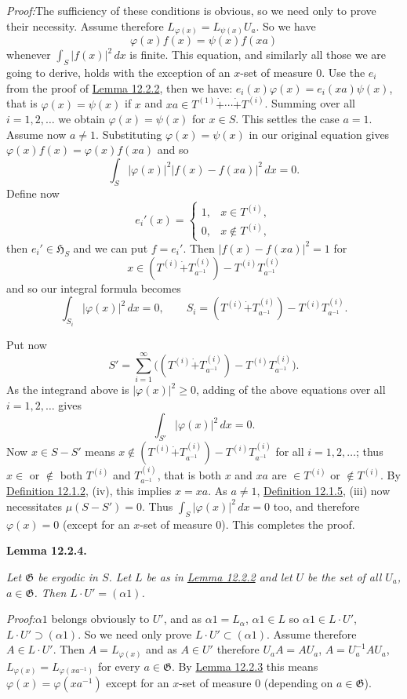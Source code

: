 \documentclass[12pt,b5paper,twoside]{article}
\newcommand{\Hspace}{\mathfrak H}
\newcommand{\Lemma}[1]{%
  \par\smallskip\noindent\phantomsection\label{lem:#1}\textbf{Lemma #1.}\enspace
}
\newcommand{\Proof}{\par\noindent\textit{Proof:}\enspace}
\newcommand{\defref}[1]{\hyperref[def:#1]{Definition #1}}
\newcommand{\lemref}[1]{\hyperref[lem:#1]{Lemma #1}}
\begin{document}
\Proof The sufficiency of these conditions is obvious, so we need only to prove
their necessity. Assume therefore $L_{\varphi(x)}=L_{\psi(x)}U_a$. So we
have
\[
 \varphi(x)f(x)=\psi(x)f(xa)
\]
whenever $\int_S|f(x)|^2\,dx$ is finite. This equation, and similarly all
those we are going to derive, holds with the exception of an $x$-set of measure
$0$. Use the $e_i$ from the proof of \lemref{12.2.2}, then we have:
$e_i(x)\varphi(x)=e_i(xa)\psi(x)$, that is $\varphi(x)=\psi(x)$ if $x$ and
$xa\in T^{(1)}\mathbin{\dot+}\cdots\mathbin{\dot+}T^{(i)}$. Summing over all
$i=1,2,\ldots$ we obtain $\varphi(x)=\psi(x)$ for $x\in S$. This settles the
case $a=1$. Assume now $a\neq1$. Substituting $\varphi(x)=\psi(x)$ in our
original equation gives $\varphi(x)f(x)=\varphi(x)f(xa)$ and so
\[
 \int_S|\varphi(x)|^2|f(x)-f(xa)|^2\,dx=0.
\]
Define now
\[
 e_i'(x)=\begin{cases}
  1,&x\in T^{(i)},\\
  0,&x\notin T^{(i)},
 \end{cases}
\]
then $e_i'\in\Hspace_S$ and we can put $f=e_i'$. Then
$|f(x)-f(xa)|^2=1$ for
\[
 x\in(T^{(i)}\mathbin{\dot+}T_{a^{-1}}^{(i)})
       -T^{(i)}T_{a^{-1}}^{(i)}
\]
and so our integral formula becomes
\[
 \int_{S_i}|\varphi(x)|^2\,dx=0,
 \qquad
 S_i=(T^{(i)}\mathbin{\dot+}T_{a^{-1}}^{(i)})
       -T^{(i)}T_{a^{-1}}^{(i)}.
\]

Put now
\[
 S'=\sum_{i=1}^\infty
 \bigl((T^{(i)}\mathbin{\dot+}T_{a^{-1}}^{(i)})
       -T^{(i)}T_{a^{-1}}^{(i)}\bigr).
\]
As the integrand above is $|\varphi(x)|^2\geq0$, adding of the above equations
over all $i=1,2,\ldots$ gives
\[
 \int_{S'}|\varphi(x)|^2\,dx=0.
\]
Now $x\in S-S'$ means
$x\notin(T^{(i)}\mathbin{\dot+}T_{a^{-1}}^{(i)})
-T^{(i)}T_{a^{-1}}^{(i)}$ for all $i=1,2,\ldots$; thus $x\in$ or $\notin$
both $T^{(i)}$ and $T_{a^{-1}}^{(i)}$, that is both $x$ and $xa$ are
$\in T^{(i)}$ or $\notin T^{(i)}$. By \defref{12.1.2}, (iv), this implies
$x=xa$. As $a\neq1$, \defref{12.1.5}, (iii) now necessitates
$\mu(S-S')=0$. Thus $\int_S|\varphi(x)|^2\,dx=0$ too, and therefore
$\varphi(x)=0$ (except for an $x$-set of measure $0$). This completes the
proof.

\Lemma{12.2.4}
\emph{Let $\mathfrak G$ be ergodic in $S$. Let $L$ be as in
\lemref{12.2.2} and let $U$ be the set of all $U_a$, $a\in\mathfrak G$. Then
$L\cdot U'=(\alpha1)$.}

\Proof $\alpha1$ belongs obviously to $U'$, and as
$\alpha1=L_\alpha$, $\alpha1\in L$ so $\alpha1\in L\cdot U'$,
$L\cdot U'\supset(\alpha1)$. So we need only prove
$L\cdot U'\subset(\alpha1)$. Assume therefore $A\in L\cdot U'$. Then
$A=L_{\varphi(x)}$ and as $A\in U'$ therefore
$U_aA=AU_a$, $A=U_a^{-1}AU_a$,
$L_{\varphi(x)}=L_{\varphi(xa^{-1})}$ for every $a\in\mathfrak G$. By
\lemref{12.2.3} this means $\varphi(x)=\varphi(xa^{-1})$ except for an
$x$-set of measure $0$ (depending on $a\in\mathfrak G$).
\end{document}
